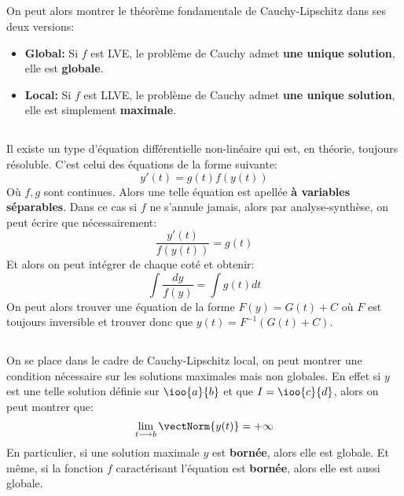 \subsection*{}
On peut alors montrer le théorème fondamentale de Cauchy-Lipschitz dans ses deux versions:
\begin{itemize}
   \item \textbf{Global:} Si \( f \) est LVE, le problème de Cauchy admet \textbf{une unique solution}, elle est \textbf{globale}.
   \item \textbf{Local:} Si \( f \) est LLVE, le problème de Cauchy admet \textbf{une unique solution}, elle est simplement \textbf{maximale}.
\end{itemize}
\subsection*{}
Il existe un type d'équation différentielle non-linéaire qui est, en théorie, toujours résoluble. C'est celui des équations de la forme suivante:
\[ 
   y'(t) = g(t)f(y(t)) 
\]
Où \( f, g \) sont continues. Alors une telle équation est apellée \textbf{à variables séparables}. Dans ce cas si \( f \) ne s'annule jamais, alors par analyse-synthèse, on peut écrire que nécessairement:
\[ 
   \frac{y'(t)}{f(y(t))}= g(t) 
\]
Et alors on peut intégrer de chaque coté et obtenir:
\[ 
   \int \frac{dy}{f(y)} = \int g(t)dt 
\]
On peut alors trouver une équation de la forme \( F(y) = G(t) + C \) où \( F \) est toujours inversible et trouver donc que \( y(t) = F^{-1}(G(t) + C) \).
\subsection*{}
On se place dans le cadre de Cauchy-Lipschitz local, on peut montrer une condition nécessaire sur les solutions maximales mais non globales. En effet si \( y \) est une telle solution définie sur \( \ioo{a}{b} \) et que \( I = \ioo{c}{d}\), alors on peut montrer que:
\[ 
   \lim_{t \longrightarrow b} \vectNorm{y(t)} = +\infty 
\]
En particulier, si une solution maximale \( y \) est \textbf{bornée}, alors elle est globale. Et même, si la fonction \( f \) caractérisant l'équation est \textbf{bornée}, alors elle est aussi globale.

